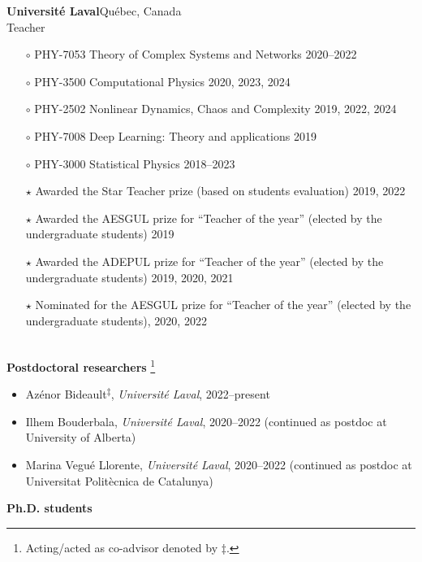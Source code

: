 \documentclass[11pt]{article}
\newcommand{\TitreSection}[1]{\colorbox{background}{\makebox[\textwidth-0.5em][c]{\Large\textrm{\textsc{#1}}}}\vspace{0.75\baselineskip}\\}
\begin{document}
%
\textbf{Universit\'e Laval}\hfill Qu\'ebec, Canada\\
Teacher
\begin{itemize}[leftmargin=1.5em]\small
  \item[$\circ$] PHY-7053 Theory of Complex Systems and Networks \hfill 2020--2022%
  \item[$\circ$] PHY-3500 Computational Physics \hfill 2020, 2023, 2024%
  \item[$\circ$] PHY-2502 Nonlinear Dynamics, Chaos and Complexity \hfill 2019, 2022, 2024%
  \item[$\circ$] PHY-7008 Deep Learning: Theory and applications \hfill 2019%
  \item[$\circ$] PHY-3000 Statistical Physics \hfill 2018--2023%
  \item[$\star$] Awarded the Star Teacher prize (based on students evaluation) 2019, 2022
  \item[$\star$] Awarded the AESGUL prize for ``Teacher of the year'' (elected by the undergraduate students) 2019
  \item[$\star$] Awarded the ADEPUL prize for ``Teacher of the year'' (elected by the undergraduate students) 2019, 2020, 2021
  \item[$\star$] Nominated for the AESGUL prize for ``Teacher of the year'' (elected by the undergraduate students), 2020, 2022
\end{itemize} \vspace{0.75\baselineskip}
%
%
%
%
%
\TitreSection{Mentoring}
%
\textbf{Postdoctoral researchers}%
%
\footnote{\label{foot:codirecteur}Acting/acted as co-advisor denoted by $\ddagger$.}
%
\begin{itemize}
  \item Azénor Bideault\textsuperscript{$\ddagger$}, \textit{Universit\'e Laval}, 2022--present
  \item Ilhem Bouderbala, \textit{Universit\'e Laval}, 2020--2022  {\small(continued as postdoc at University of Alberta)}
  \item Marina Vegué Llorente, \textit{Université Laval}, 2020--2022 {\small(continued as postdoc at Universitat Politècnica de Catalunya)}
\end{itemize}
%
%
%
\textbf{Ph.D. students}%
\end{document}
